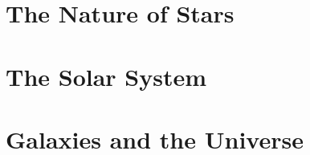 \documentclass[openany]{ctexbook}
\begin{document}
\part{The Nature of Stars}












\setcounter{chapter}{17}


\part{The Solar System}


\setcounter{chapter}{21}




\part{Galaxies and the Universe}




\end{document}

